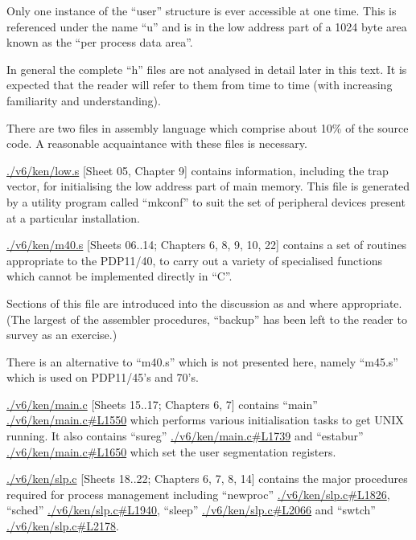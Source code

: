 Only one instance of the ``user''
structure is ever accessible at one
time. This is referenced under the
name ``u'' and is in the low address
part of a 1024 byte area known as
the ``per process data area''.

In general the complete ``h'' files are
not analysed in detail later in this
text. It is expected that the reader
will refer to them from time to time
(with increasing familiarity and understanding).
\ed



There are two files in assembly
language which comprise about 10\% of
the source code. A reasonable acquaintance 
with these files is necessary.

\bd
\item[low.s] \url{./v6/ken/low.s} [Sheet 05, Chapter 9] contains
information, including the trap vector,
for initialising the low
address part of main memory. This
file is generated by a utility program 
called ``mkconf'' to suit the set
of peripheral devices present at a
particular installation.

\item[m40.s] \url{./v6/ken/m40.s} [Sheets 06..14; Chapters 6, 8,
9, 10, 22] contains a set of routines 
appropriate to the PDP11/40,
to carry out a variety of specialised 
functions which cannot be
implemented directly in ``C''.
\ed

Sections of this file are introduced
into the discussion as and where
appropriate. (The largest of the
assembler procedures, ``backup'' has
been left to the reader to survey as
an exercise.)

There is an alternative to ``m40.s''
which is not presented here, namely
``m45.s'' which is used on PDP11/45's
and 70's.



\bd
\item[main.c] \url{./v6/ken/main.c} [Sheets 15..17; Chapters 6,
7] contains ``main'' \url{./v6/ken/main.c#L1550} which performs
various initialisation tasks to get
UNIX running. It also contains
``sureg'' \url{./v6/ken/main.c#L1739} and ``estabur'' \url{./v6/ken/main.c#L1650} which set the
user segmentation registers.


\item[slp.c] \url{./v6/ken/slp.c} [Sheets 18..22; Chapters 6, 7,
8, 14] contains the major procedures
required for process management
including ``newproc'' \url{./v6/ken/slp.c#L1826}, ``sched'' \url{./v6/ken/slp.c#L1940},
``sleep'' \url{./v6/ken/slp.c#L2066} and ``swtch'' \url{./v6/ken/slp.c#L2178}.



